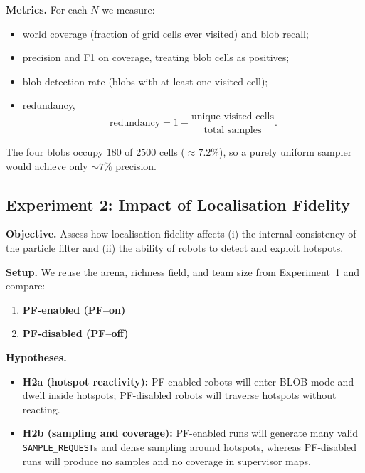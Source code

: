 \documentclass[lettersize,journal]{IEEEtran}
\begin{document}
\textbf{Metrics.}
For each $N$ we measure:
\begin{itemize}
    \item world coverage (fraction of grid cells ever visited) and blob recall;
    \item precision and F1 on coverage, treating blob cells as positives;
    \item blob detection rate (blobs with at least one visited cell);
    \item redundancy,
    \begin{equation}
      \text{redundancy} =
      1 - \frac{\text{unique visited cells}}{\text{total samples}}.
      \label{redundancy}
    \end{equation}
\end{itemize}
The four blobs occupy $180$ of $2500$ cells ($\approx 7.2\%$), so a purely
uniform sampler would achieve only $\sim 7\%$ precision.

\subsection{Experiment 2: Impact of Localisation Fidelity }

\textbf{Objective.}
Assess how localisation fidelity affects (i) the internal consistency of the
particle filter and (ii) the ability of robots to detect and exploit hotspots.

\textbf{Setup.}
We reuse the arena, richness field, and team size from
Experiment~1 and compare:
\begin{enumerate}
    \item \textbf{PF-enabled (PF--on)} 
    \item \textbf{PF-disabled (PF--off)} 
\end{enumerate}

\textbf{Hypotheses.}
\begin{itemize}
    \item \textbf{H2a (hotspot reactivity):} PF-enabled robots will enter BLOB
    mode and dwell inside hotspots; PF-disabled robots will traverse hotspots
    without reacting.
    \item \textbf{H2b (sampling and coverage):} PF-enabled runs will generate
    many valid \texttt{SAMPLE\_REQUEST}s and dense sampling around hotspots,
    whereas PF-disabled runs will produce no samples and no coverage in
    supervisor maps.
\end{itemize}
\end{document}
